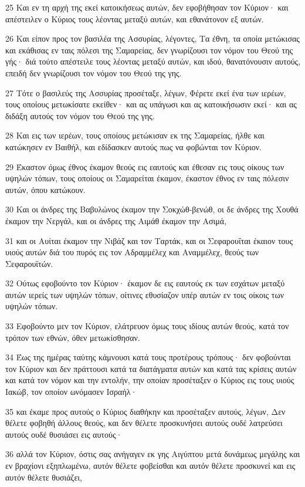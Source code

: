 \par 25 Και εν τη αρχή της εκεί κατοικήσεως αυτών, δεν εφοβήθησαν τον Κύριον· και απέστειλεν ο Κύριος τους λέοντας μεταξύ αυτών, και εθανάτονον εξ αυτών.
\par 26 Και είπον προς τον βασιλέα της Ασσυρίας, λέγοντες, Τα έθνη, τα οποία μετώκισας και εκάθισας εν ταις πόλεσι της Σαμαρείας, δεν γνωρίζουσι τον νόμον του Θεού της γής· διά τούτο απέστειλε τους λέοντας μεταξύ αυτών, και ιδού, θανατόνουσιν αυτούς, επειδή δεν γνωρίζουσι τον νόμον του Θεού της γης.
\par 27 Τότε ο βασιλεύς της Ασσυρίας προσέταξε, λέγων, Φέρετε εκεί ένα των ιερέων, τους οποίους μετωκίσατε εκείθεν· και ας υπάγωσι και ας κατοικήσωσιν εκεί· και ας διδάξη αυτούς τον νόμον του Θεού της γης.
\par 28 Και εις των ιερέων, τους οποίους μετώκισαν εκ της Σαμαρείας, ήλθε και κατώκησεν εν Βαιθήλ, και εδίδασκεν αυτούς πως να φοβώνται τον Κύριον.
\par 29 Έκαστον όμως έθνος έκαμον θεούς εις εαυτούς και έθεσαν εις τους οίκους των υψηλών τόπων, τους οποίους οι Σαμαρείται έκαμον, έκαστον έθνος εν ταις πόλεσιν αυτών, όπου κατώκουν.
\par 30 Και οι άνδρες της Βαβυλώνος έκαμον την Σοκχώθ-βενώθ, οι δε άνδρες της Χουθά έκαμον την Νεργάλ, και οι άνδρες της Αιμάθ έκαμον την Ασιμά,
\par 31 και οι Αυίται έκαμον την Νιβάζ και τον Ταρτάκ, και οι Σεφαρουΐται έκαιον τους υιούς αυτών διά του πυρός εις τον Αδραμμέλεχ και Αναμμέλεχ, θεούς των Σεφαρουϊτών.
\par 32 Ούτως εφοβούντο τον Κύριον· έκαμον δε εις εαυτούς εκ των εσχάτων μεταξύ αυτών ιερείς των υψηλών τόπων, οίτινες εθυσίαζον υπέρ αυτών εν τοις οίκοις των υψηλών τόπων.
\par 33 Εφοβούντο μεν τον Κύριον, ελάτρευον όμως τους ιδίους αυτών θεούς, κατά τον τρόπον των εθνών, όθεν μετωκίσθησαν.
\par 34 Έως της ημέρας ταύτης κάμνουσι κατά τους προτέρους τρόπους· δεν φοβούνται τον Κύριον και δεν πράττουσι κατά τα διατάγματα αυτών και κατά τας κρίσεις αυτών και κατά τον νόμον και την εντολήν, την οποίαν προσέταξεν ο Κύριος εις τους υιούς Ιακώβ, τον οποίον ωνόμασεν Ισραήλ·
\par 35 και έκαμε προς αυτούς ο Κύριος διαθήκην και προσέταξεν αυτούς, λέγων, Δεν θέλετε φοβηθή άλλους θεούς, και δεν θέλετε προσκυνήσει αυτούς ουδέ λατρεύσει αυτούς ουδέ θυσιάσει εις αυτούς·
\par 36 αλλά τον Κύριον, όστις σας ανήγαγεν εκ γης Αιγύπτου μετά δυνάμεως μεγάλης και εν βραχίονι εξηπλωμένω, αυτόν θέλετε φοβείσθαι και αυτόν θέλετε προσκυνεί και εις αυτόν θέλετε θυσιάζει,
